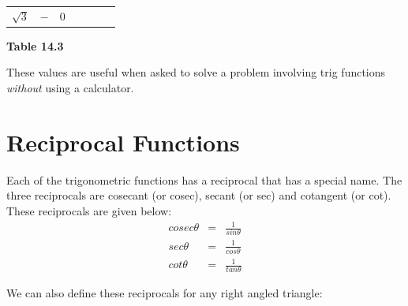 {\begin{center}
\begin{xtabular*}{\mytablewidth}[t]{|p{10\mystarwidth}|p{10\mystarwidth}|p{10\mystarwidth}|p{10\mystarwidth}|p{10\mystarwidth}|p{10\mystarwidth}|p{10\mystarwidth}|}
                $\sqrt{3}$
               &
                $-$
               &
        0%
     \tabularnewline{}
    \end{xtabular*}
      \end{center}
    \begin{center}{\small\bfseries Table 14.3}\end{center}
        }%
    \par
      \label{m39408*id81112}These values are useful when asked to solve a problem involving trig functions \textsl{without} using a calculator.\par 
\section{Reciprocal Functions}
\label{m39408*eip-466}Each of the trigonometric functions has a reciprocal that has a special name. The three reciprocals are cosecant (or cosec), secant (or sec) and cotangent (or cot). These reciprocals are given below:
\label{m39408*eid64932}\nopagebreak\noindent{}
    \begin{equation}
    \begin{array}{ccc}cosec\theta & =& \frac{1}{sin\theta }\\ sec\theta & =& \frac{1}{cos\theta }\\ cot\theta & =& \frac{1}{tan\theta }\end{array}\tag{14.10}
      \end{equation}
\par \label{m39408*eip-520}We can also define these reciprocals for any right angled triangle:
\label{m39408*eid96732}\nopagebreak\noindent{}

